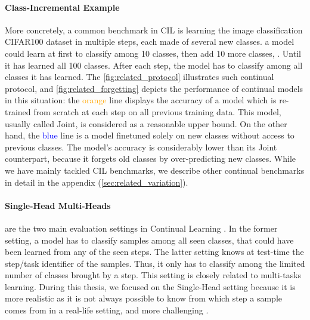 \paragraph{Class-Incremental Example} More concretely, a common benchmark in \acf{CIL} is learning
the image classification CIFAR100 dataset \citep{krizhevskycifar100} in multiple steps, each made of
several new classes. \eg a model could learn at first to classify among 10 classes, then add 10 more
classes, \etc. Until it has learned all 100 classes. After each step, the model has to classify
among all classes it has learned. The \autoref{fig:related_protocol} illustrates such continual
protocol, and \autoref{fig:related_forgetting} depicts the performance of continual models in this
situation: the \textcolor{orange}{orange} line displays the accuracy of a model which is re-trained
from scratch at each step on all previous training data. This model, usually called Joint, is
considered as a reasonable upper bound. On the other hand, the \textcolor{blue}{blue} line is a
model finetuned solely on new classes without access to previous classes. The model's accuracy is
considerably lower than its Joint counterpart, because it forgets old classes by over-predicting new
classes. While we have mainly tackled \acf{CIL} benchmarks, we describe other continual benchmarks in
detail in the appendix (\autoref{sec:related_variation}).

\paragraph{Single-Head \vs Multi-Heads} are the two main evaluation settings in Continual Learning
\citep{chaudhry2018riemannien_walk}. In the former setting, a model has to classify samples among
all seen classes, that could have been learned from any of the seen steps. The latter setting knows
at test-time the step/task identifier of the samples. Thus, it only has to classify among the limited
number of classes brought by a step. This setting is closely related to multi-tasks learning. During
this thesis, we focused on the Single-Head setting because it is more realistic as it is not always
possible to know from which step a sample comes from in a real-life setting, and more challenging
\citep{lesort2019regulshortcomings}.

